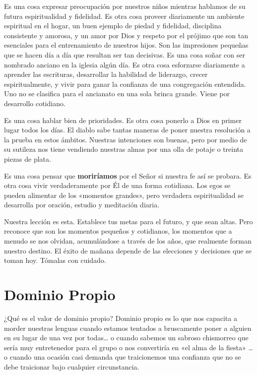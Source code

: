 \documentclass[12pt, twoside, openright]{book}
\begin{document}
Es una cosa expresar preocupación por nuestros niños mientras hablamos de su futura espiritualidad y fidelidad. Es otra cosa proveer diariamente un ambiente espiritual en el hogar, un buen ejemplo de piedad y fidelidad, disciplina consistente y amorosa, y un amor por Dios y respeto por el prójimo que son tan esenciales para el entrenamiento de nuestros hijos. Son las impresiones pequeñas que se hacen día a día que resultan ser tan decisivas. 
Es una cosa soñar con ser nombrado anciano en la iglesia algún día. Es otra cosa esforzarse diariamente a aprender las escrituras, desarrollar la habilidad de liderazgo, crecer espiritualmente, y vivir para ganar la confianza de una congregación entendida. Uno no se clasifica para el ancianato en una sola brinca grande. Viene por desarrollo cotidiano. 

Es una cosa hablar bien de prioridades. Es otra cosa ponerlo a Dios en primer lugar todos los días. El diablo sabe tantas maneras de poner nuestra resolución a la prueba en estos ámbitos. Nuestras intenciones son buenas, pero por medio de su sutileza nos tiene vendiendo nuestras almas por una olla de potaje o treinta piezas de plata. 

Es una cosa pensar que \textbf{moriríamos} por el Señor si nuestra fe así se probara. Es otra cosa vivir verdaderamente por Él de una forma cotidiana. Los egos se pueden alimentar de los «momentos grandes», pero verdadera espiritualidad se desarrolla por oración, estudio y meditación diaria.

Nuestra lección es esta. Establece tus metas para el futuro, y que sean altas. Pero reconoce que son los momentos pequeños y cotidianos, los momentos que a menudo se nos olvidan, acumulándose a través de los años, que realmente forman nuestro destino. El éxito de mañana depende de las elecciones y decisiones que se toman hoy. Tómalas con cuidado.

\section{Dominio Propio}
¿Qué es el valor de dominio propio? Dominio propio es lo que nos capacita a morder nuestras lenguas cuando estamos tentados a bruscamente poner a alguien en su lugar de una vez por todas… o cuando sabemos un sabroso chismorreo que sería muy entretenedor para el grupo o nos convertiría en «el alma de la fiesta» … o cuando una ocasión casi demanda que traicionemos una confianza que no se debe traicionar bajo cualquier circunstancia. 
\end{document}
